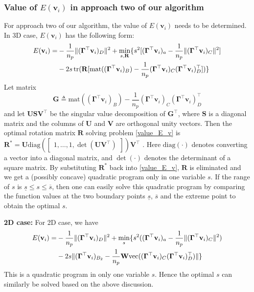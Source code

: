\documentclass[11pt,bezier,]{article}
\begin{document}
\subsubsection{Value of $E( \mathbf v_i)$ in approach two of our algorithm}
For approach two of our algorithm, 
the value of  $E( \mathbf v_i)$  needs  to be determined.
In 3D case, $E( \mathbf v_i)$ has the following form:
\begin{align}
 E(\mathbf v_i)= &
- \frac{1}{n_p} \|(\mathbf \Gamma^\top\mathbf v_i)_D \|^2  %
+ \min_{s,\mathbf R} \{s^2 [ (\mathbf \Gamma^\top\mathbf v_i)_a  
- \frac{1}{n_p}    \|(\mathbf \Gamma^\top\mathbf v_i)_C \|^2 ]  \notag\\ 
& - 2s\, \text{tr}(\mathbf R [ \text{mat} ((\mathbf \Gamma^\top\mathbf v_i)_B) 
- \frac{1}{n_p} (\mathbf \Gamma^\top\mathbf v_i)_C (\mathbf \Gamma^\top\mathbf v_i)_D^\top  ]) \} 
\label{value_E_v}
\end{align}
Let matrix
\[
\mathbf G\triangleq   \text{mat} ((\mathbf \Gamma^\top\mathbf v_i)_B) 
- \frac{1}{n_p} (\mathbf \Gamma^\top\mathbf v_i)_C (\mathbf \Gamma^\top\mathbf v_i)_D^\top  
\]
and let $\mathbf U\mathbf S\mathbf V^\top$ be the singular value decomposition of $\mathbf G^\top$,
where $\mathbf S$ is a diagonal matrix and
the columns of  $\mathbf U$ and $\mathbf V$ are orthogonal unity vectors.
Then the optimal rotation matrix $\mathbf R$ solving problem  \eqref{value_E_v} is
$ \mathbf R^*=\mathbf U\text{diag}(\begin{bmatrix}
                     1,\ldots,1,\det(\mathbf U\mathbf V^\top)
                    \end{bmatrix})\mathbf V^\top$ \cite{CPD}.
Here $\text{diag}(\cdot)$ denotes converting a vector into a diagonal matrix,
and $\det(\cdot)$ denotes the determinant of a square matrix.
By substituting $ \mathbf R^*$ back into \eqref{value_E_v}, $\mathbf R$ is eliminated and
we get a (possibly concave) quadratic program only  in one variable $s$.
If the range of $s$ is $\underline{s}\le s \le \overline{s}$,
then one can easily solve  this  quadratic program 
by comparing the function values at the two boundary points $\underline{s}$, $\overline{s}$ and 
the extreme point to obtain  the optimal $s$.


\textbf{2D case:}
For 2D case, we have
\begin{align}
 E(\mathbf  v_i)= &
- \frac{1}{n_p} \|(\mathbf \Gamma^\top\mathbf v_i)_D \|^2  %
+ \min_{s} \{s^2 ( (\mathbf \Gamma^\top\mathbf v_i)_a  
- \frac{1}{n_p}    \|(\mathbf \Gamma^\top\mathbf v_i)_C \|^2)  \notag\\ 
& - 2s \|  (\mathbf \Gamma^\top\mathbf v_i)_{B_2}  
- \frac{1}{n_p} \mathbf W \text{vec}((\mathbf \Gamma^\top\mathbf v_i)_C (\mathbf \Gamma^\top\mathbf v_i)_D^\top)  \| \} 
\end{align}
This is a quadratic program in only one variable  $s$.
Hence the optimal $s$ can  similarly be solved based on the above discussion.
 
\end{document}
